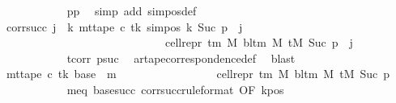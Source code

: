 \begin{isabellebody}
\ \ \ \ \ \ \ \ \ \ \isamarkupfalse%
\ pp\ \isamarkupfalse%
\ {\isacharparenleft}{\kern0pt}simp\ add{\isacharcolon}{\kern0pt}\ sim{\isacharunderscore}{\kern0pt}pos{\isacharunderscore}{\kern0pt}def{\isacharparenright}{\kern0pt}\isanewline
\ \ \ \ \ \ \ \ \isamarkupfalse%
\ corr{\isacharunderscore}{\kern0pt}succ{\isacharcolon}{\kern0pt}\ {\isachardoublequoteopen}{\isasymforall}j\ {\isacharless}{\kern0pt}\ {\isacharquery}{\kern0pt}k{\isachardot}{\kern0pt}\ mt{\isacharunderscore}{\kern0pt}tape\ c{\isacharprime}{\kern0pt}\ tk\ {\isacharparenleft}{\kern0pt}sim{\isacharunderscore}{\kern0pt}pos\ {\isacharquery}{\kern0pt}k\ {\isacharparenleft}{\kern0pt}Suc\ p{\isacharparenright}{\kern0pt}\ {\isacharplus}{\kern0pt}\ j{\isacharparenright}{\kern0pt}\isanewline
\ \ \ \ \ \ \ \ \ \ \ \ \ \ \ \ \ \ \ \ \ \ \ \ \ \ \ \ {\isacharequal}{\kern0pt}\ cell{\isacharunderscore}{\kern0pt}repr\ {\isacharparenleft}{\kern0pt}{\isasymGamma}{\isacharunderscore}{\kern0pt}tm\ M{\isacharparenright}{\kern0pt}\ {\isacharparenleft}{\kern0pt}bl{\isacharunderscore}{\kern0pt}tm\ M{\isacharparenright}{\kern0pt}\ {\isacharparenleft}{\kern0pt}tM\ {\isacharparenleft}{\kern0pt}Suc\ p{\isacharparenright}{\kern0pt}{\isacharparenright}{\kern0pt}\ {\isacharbang}{\kern0pt}\ j{\isachardoublequoteclose}\isanewline
\ \ \ \ \ \ \ \ \ \ \isamarkupfalse%
\ tcorr\ psuc{}\ \isamarkupfalse%
\ ar{\isacharunderscore}{\kern0pt}tape{\isacharunderscore}{\kern0pt}correspondence{\isacharunderscore}{\kern0pt}def\ \isamarkupfalse%
\ blast\isanewline
\ \ \ \ \ \ \ \ \isamarkupfalse%
\ {\isachardoublequoteopen}mt{\isacharunderscore}{\kern0pt}tape\ c{\isacharprime}{\kern0pt}\ tk\ {\isacharparenleft}{\kern0pt}{\isacharquery}{\kern0pt}base\ {\isacharplus}{\kern0pt}\ m{\isacharparenright}{\kern0pt}\isanewline
\ \ \ \ \ \ \ \ \ \ \ \ \ \ \ \ {\isacharequal}{\kern0pt}\ cell{\isacharunderscore}{\kern0pt}repr\ {\isacharparenleft}{\kern0pt}{\isasymGamma}{\isacharunderscore}{\kern0pt}tm\ M{\isacharparenright}{\kern0pt}\ {\isacharparenleft}{\kern0pt}bl{\isacharunderscore}{\kern0pt}tm\ M{\isacharparenright}{\kern0pt}\ {\isacharparenleft}{\kern0pt}tM\ {\isacharparenleft}{\kern0pt}Suc\ p{\isacharparenright}{\kern0pt}{\isacharparenright}{\kern0pt}\ {\isacharbang}{\kern0pt}\ {}{\isachardoublequoteclose}\isanewline
\ \ \ \ \ \ \ \ \ \ \isamarkupfalse%
\ meq\ base{\isacharunderscore}{\kern0pt}succ\ corr{\isacharunderscore}{\kern0pt}succ{\isacharbrackleft}{\kern0pt}rule{\isacharunderscore}{\kern0pt}format{\isacharcomma}{\kern0pt}\ OF\ kpos{\isacharbrackright}{\kern0pt}\ \isamarkupfalse%

\end{isabellebody}
